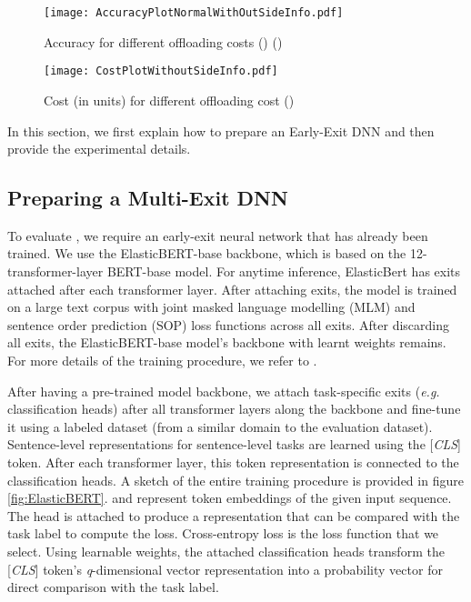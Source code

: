 \begin{figure*}
    \centering \texttt{[image: AccuracyPlotNormalWithOutSideInfo.pdf]}
    \caption{Accuracy for different offloading costs () (\our{})}
    \label{fig:Accuracy_res_eesplit}
\end{figure*}

\begin{figure*}
    \centering \texttt{[image: CostPlotWithoutSideInfo.pdf]}
    \caption{Cost (in  units) for different offloading cost (\our{})}
    \label{fig:cost_res_eesplit}
\end{figure*}
In this section, we first explain how to prepare an Early-Exit DNN and then provide the experimental details.
\subsection{Preparing a Multi-Exit DNN}\label{sec: ElasticBERT}
To evaluate \our{}, we require an early-exit neural network that has already been trained. We use the ElasticBERT-base backbone, which is based on the 12-transformer-layer BERT-base model. For anytime inference, ElasticBert has exits attached after each transformer layer. After attaching exits, the model is trained on a large text corpus with joint masked language modelling (MLM) and sentence order prediction (SOP) loss functions across all exits. After discarding all exits, the ElasticBERT-base model's backbone with learnt weights remains. For more details of the training procedure, we refer to \cite{liu2021elasticbert}.

After having a pre-trained model backbone, we attach task-specific exits (\textit{e.g.} classification heads) after all transformer layers along the backbone and fine-tune it using a labeled dataset (from a similar domain to the evaluation dataset). Sentence-level representations for sentence-level tasks are learned using the [\textit{CLS}] token. After each transformer layer, this token representation is connected to the classification heads. 
A sketch of the entire training procedure is provided in figure \ref{fig:ElasticBERT}.  and  represent token embeddings of the given input sequence. The head is attached to produce a representation that can be compared with the task label to compute the loss. Cross-entropy loss is the loss function that we select. Using learnable weights, the attached classification heads transform the [\textit{CLS}] token's \textit{q}-dimensional vector representation into a probability vector for direct comparison with the task label. 



